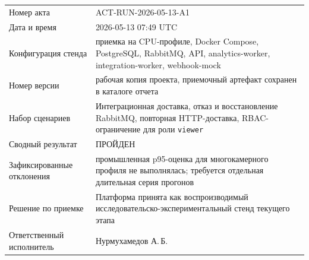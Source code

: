 \begin{longtable}{@{}p{}p{}@{}}
Номер акта & ACT-RUN-2026-05-13-A1 \\
Дата и время & 2026-05-13 07:49 UTC \\
Конфигурация стенда & приемка на CPU-профиле, Docker Compose, PostgreSQL, RabbitMQ, API, analytics-worker, integration-worker, webhook-mock \\
Номер версии & рабочая копия проекта, приемочный артефакт сохранен в каталоге отчета \\
Набор сценариев & Интеграционная доставка, отказ и восстановление RabbitMQ, повторная HTTP-доставка, RBAC-ограничение для роли \texttt{viewer} \\
Сводный результат & ПРОЙДЕН \\
Зафиксированные отклонения & промышленная p95-оценка для многокамерного профиля не выполнялась; требуется отдельная длительная серия прогонов \\
Решение по приемке & Платформа принята как воспроизводимый исследовательско-экспериментальный стенд текущего этапа \\
Ответственный исполнитель & Нурмухамедов А.\,Б. \\
\end{longtable}
